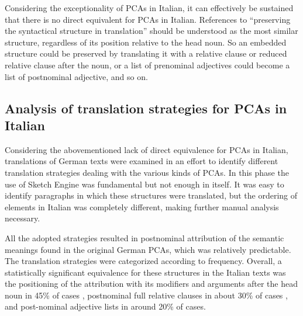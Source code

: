 \documentclass[output=paper,colorlinks,citecolor=brown]{langscibook}
\begin{document}
Considering the exceptionality of PCAs in Italian, it can effectively be sustained that there is no direct equivalent for PCAs in Italian. References to “preserving the syntactical structure in translation” should be understood as the most similar structure, regardless of its position relative to the head noun. So an embedded structure could be preserved by translating it with a relative clause or reduced relative clause after the noun, or a list of prenominal adjectives could become a list of postnominal adjective, and so on.

\subsection{ Analysis of translation strategies for PCAs in Italian}\label{sec:5.2}

Considering the abovementioned lack of direct equivalence for PCAs in Italian, translations of German texts were examined in an effort to identify different translation strategies dealing with the various kinds of PCAs. In this phase the use of Sketch Engine was fundamental but not enough in itself. It was easy to identify paragraphs in which these structures were translated, but the ordering of elements in Italian was completely different, making further manual analysis necessary.

All the adopted strategies resulted in postnominal attribution of the semantic meanings found in the original German PCAs, which was relatively predictable. The translation strategies were categorized according to frequency. Overall, a statistically significant equivalence for these structures in the Italian texts was the positioning of the attribution with its modifiers and arguments after the head noun in 45\% of cases , postnominal full relative clauses in about 30\% of cases , and post-nominal adjective lists in around 20\% of cases.


\ea%
    \label{ex:resi:32}

  \z
\z
\end{document}
